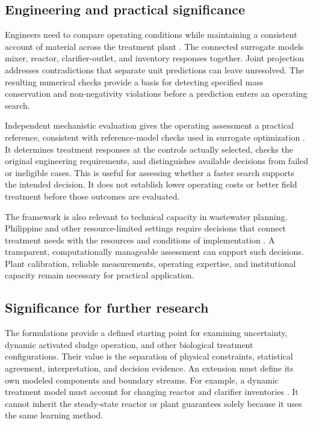 \subsection{Engineering and practical significance}

Engineers need to compare operating conditions while maintaining a consistent account of material across the treatment plant \citep{Henze2008,Alex2008}. The connected surrogate models mixer, reactor, clarifier-outlet, and inventory responses together. Joint projection addresses contradictions that separate unit predictions can leave unresolved. The resulting numerical checks provide a basis for detecting specified mass conservation and non-negativity violations before a prediction enters an operating search.

Independent mechanistic evaluation gives the operating assessment a practical reference, consistent with reference-model checks used in surrogate optimization \citep{Alexandrov1998,Pedrozo2025}. It determines treatment responses at the controls actually selected, checks the original engineering requirements, and distinguishes available decisions from failed or ineligible cases. This is useful for assessing whether a faster search supports the intended decision. It does not establish lower operating costs or better field treatment before those outcomes are evaluated.

The framework is also relevant to technical capacity in wastewater planning. Philippine and other resource-limited settings require decisions that connect treatment needs with the resources and conditions of implementation \citep{Tabios2020,DamalerioBarriers2022,Ulrich2009}. A transparent, computationally manageable assessment can support such decisions. Plant calibration, reliable measurements, operating expertise, and institutional capacity remain necessary for practical application.

\subsection{Significance for further research}

The formulations provide a defined starting point for examining uncertainty, dynamic activated sludge operation, and other biological treatment configurations. Their value is the separation of physical constraints, statistical agreement, interpretation, and decision evidence. An extension must define its own modeled components and boundary streams. For example, a dynamic treatment model must account for changing reactor and clarifier inventories \citep{Takacs1991,Alex2008}. It cannot inherit the steady-state reactor or plant guarantees solely because it uses the same learning method.


